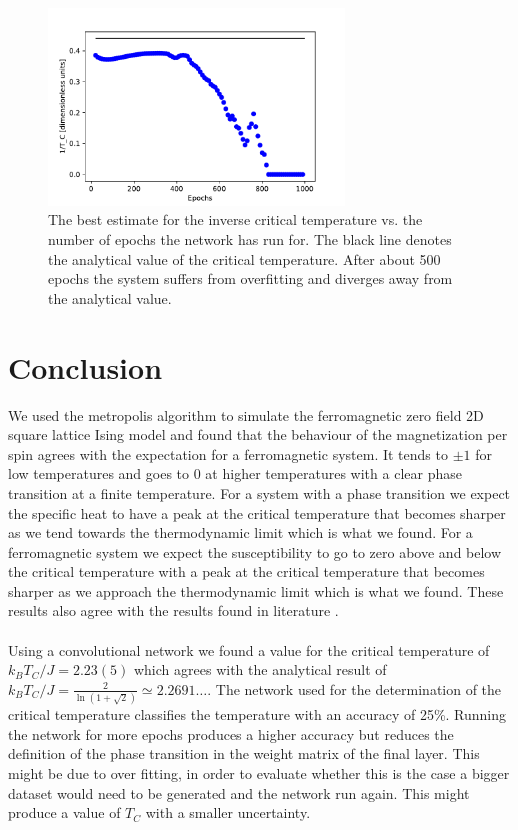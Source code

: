 \documentclass[10 pt, a4paper]{article}
\begin{document}
\begin{figure}[H]
\centering
\includegraphics[width=0.7\textwidth]{epochs}
\caption{The best estimate for the inverse critical temperature vs. the number of epochs the network has run for. The black line denotes the analytical value of the critical temperature. After about 500 epochs the system suffers from overfitting and diverges away from the analytical value. \label{fig:epochs}}
\end{figure}

\section{Conclusion}


We used the metropolis algorithm to simulate the ferromagnetic zero field 2D square lattice Ising model and found that the behaviour of the magnetization per spin agrees with the expectation for a ferromagnetic system. It tends to $\pm 1$ for low temperatures and goes to 0 at higher temperatures with a clear phase transition at a finite temperature. For a system with a phase transition we expect the specific heat to have a peak at the critical temperature that becomes sharper as we tend towards the thermodynamic limit which is what we found. For a ferromagnetic system we expect the susceptibility to go to zero above and below the critical temperature with a peak at the critical temperature that becomes sharper as we approach the thermodynamic limit which is what we found. These results also agree with the results found in literature \cite{thijssen}.
\\
\\
Using a convolutional network we found a value for the critical temperature of $k_B T_C / J = 2.23(5)$ which agrees with the analytical result of $k_B T_C / J = \frac{2}{\ln(1 + \sqrt{2})} \simeq 2.2691 \dots $. The network used for the determination of the critical temperature classifies the temperature with an accuracy of 25\%. Running the network for more epochs produces a higher accuracy but reduces the definition of the phase transition in the weight matrix of the final layer. This might be due to over fitting, in order to evaluate whether this is the case a bigger dataset would need to be generated and the network run again. This might produce a value of $T_C$ with a smaller uncertainty.
\end{document}
